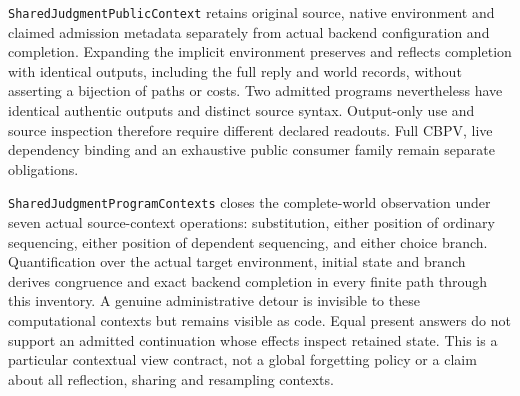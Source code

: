 \documentclass[11pt]{article}
\theoremstyle{definition}
\theoremstyle{remark}
\begin{document}
\nolinkurl{SharedJudgmentPublicContext} retains original source, native
environment and claimed admission metadata separately from actual backend
configuration and completion. Expanding the implicit environment preserves
and reflects completion with identical outputs, including the full reply
and world records, without asserting a bijection of paths or costs. Two
admitted programs nevertheless have identical authentic outputs and
distinct source syntax. Output-only use and source inspection therefore
require different declared readouts. Full CBPV, live dependency binding and
an exhaustive public consumer family remain separate obligations.

\nolinkurl{SharedJudgmentProgramContexts} closes the complete-world
observation under seven actual source-context operations: substitution,
either position of ordinary sequencing, either position of dependent
sequencing, and either choice branch. Quantification over the actual target
environment, initial state and branch derives congruence and exact backend
completion in every finite path through this inventory. A genuine
administrative detour is invisible to these computational contexts but
remains visible as code. Equal present answers do not support an admitted
continuation whose effects inspect retained state. This is a particular
contextual view contract, not a global forgetting policy or a claim about
all reflection, sharing and resampling contexts.
\end{document}
